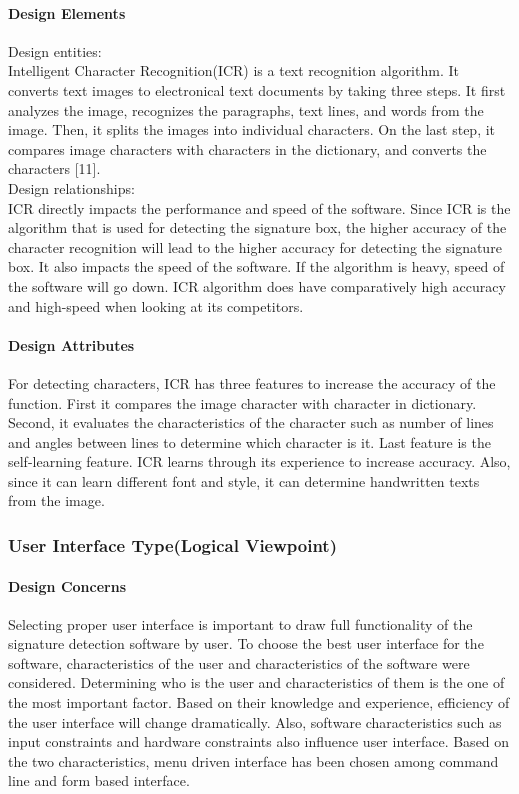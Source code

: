 \documentclass[article, onecolumn, draftclsnofoot,10pt, compsoc]{IEEEtran}
\begin{document}
\paragraph{Design Elements}
Design entities: \\
Intelligent Character Recognition(ICR) is a text recognition algorithm. It converts text images to electronical text documents by taking three steps. It first analyzes the image, recognizes the paragraphs, text lines, and words from the image. Then, it splits the images into individual characters. On the last step, it compares image characters with characters in the dictionary, and converts the characters [11].  \\

Design relationships:\\
ICR directly impacts the performance and speed of the software. Since ICR is the algorithm that is used for detecting the signature box, the higher accuracy of the character recognition will lead to the higher accuracy for detecting the signature box. It also impacts the speed of the software. If the algorithm is heavy, speed of the software will go down. ICR algorithm does have comparatively high accuracy and high-speed when looking at its competitors.\\

\paragraph{Design Attributes}
For detecting characters, ICR has three features to increase the accuracy of the function. First it compares the image character with character in dictionary. Second, it evaluates the characteristics of the character such as number of lines and angles between lines to determine which character is it. Last feature is the self-learning feature. ICR learns through its experience to increase accuracy. Also, since it can learn different font and style, it can determine handwritten texts from the image.


\subsubsection{User Interface Type(Logical Viewpoint)}
\paragraph{Design Concerns}
Selecting proper user interface is important to draw full functionality of the signature detection software by user. To choose the best user interface for the software, characteristics of the user and characteristics of the software were considered. Determining who is the user and characteristics of them is the one of the most important factor. Based on their knowledge and experience, efficiency of the user interface will change dramatically. Also, software characteristics such as input constraints and hardware constraints also influence user interface. Based on the two characteristics, menu driven interface has been chosen among command line and form based interface. 
\end{document}
